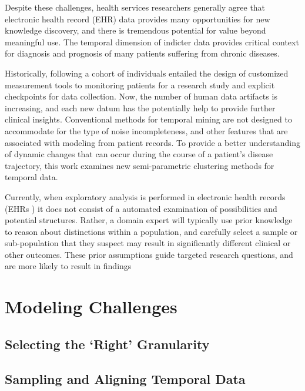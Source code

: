 Despite these challenges, health services researchers generally agree that electronic health record (EHR) data provides many opportunities for new knowledge discovery, and there is tremendous potential for value beyond meaningful use.  The temporal dimension of indicter data provides critical context for diagnosis and prognosis of many patients suffering from chronic diseases.

Historically, following a cohort of individuals entailed the design of customized measurement tools to monitoring patients for a research study and explicit checkpoints for data collection.  Now, the number of human data artifacts is increasing, and each new datum has the potentially help to provide further clinical insights.  Conventional methods for temporal mining are not designed to accommodate for the type of noise incompleteness, and other features that are associated with modeling from patient records.  To provide a better understanding of dynamic changes that can occur during the course of a patient's disease trajectory, this work examines new semi-parametric clustering methods for temporal data.

Currently, when exploratory analysis is performed in electronic health records (EHRs ) it does not consist of a automated examination of possibilities and potential structures.  Rather, a domain expert will typically use prior knowledge to reason about distinctions within a population, and carefully select a sample or sub-population that they suspect may result in significantly different clinical or other outcomes.  These prior assumptions guide targeted research questions, and are more likely to result in findings~\cite{Ioannidis05}

\section{Modeling Challenges}
\subsection{Selecting the `Right' Granularity}
\subsection{Sampling and Aligning Temporal Data}
